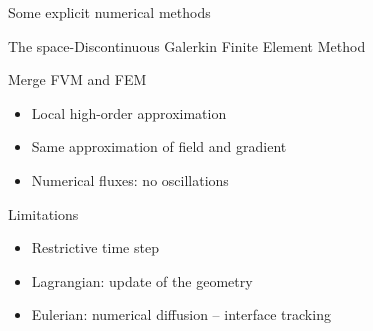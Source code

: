 \begin{withoutheadline}
  \begin{frame}{Some explicit numerical methods}
    \begin{block}{The space-Discontinuous Galerkin Finite Element Method \cite{Cockburn}}
      \begin{footnotesize}
        \begin{block}{\footnotesize Merge FVM and FEM}
          \vspace{-.2cm}
          \begin{itemize}
          \item[] Local high-order approximation \cite{NeutronDG}
          \item[] Same approximation of field and gradient
          \item[] Numerical fluxes: no oscillations
          \end{itemize}
        \end{block}
        \vspace{-.2cm}
        \begin{block}{\footnotesize Limitations}
          \vspace{-.2cm}
          \begin{itemize}
          \item[] Restrictive time step
          \item[] Lagrangian: update of the geometry \cite{LagrangianDG_thesis}
          \item[] Eulerian: numerical diffusion -- interface tracking%
          \end{itemize}
        \end{block}
      \end{footnotesize}
    \end{block}
  \end{frame}
\end{withoutheadline}


